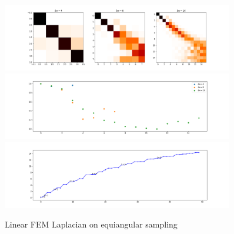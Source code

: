 \begin{figure}[h]
	\label{fig:HeatKernelGraphLaplacianEquiangular}
	\caption{Linear FEM Laplacian on equiangular sampling}
	\centering
	\includegraphics[width=0.9\textwidth]{../codes/02.HeatKernelGraphLaplacian/equiangular/equi_full.png}
	\includegraphics[width=0.9\textwidth]{../codes/02.HeatKernelGraphLaplacian/equiangular/equi_full_diagonal.png}	
	\includegraphics[width=0.9\textwidth]{../codes/02.HeatKernelGraphLaplacian/equiangular/equi_full_eigenvalues_16.png}	
\end{figure}

